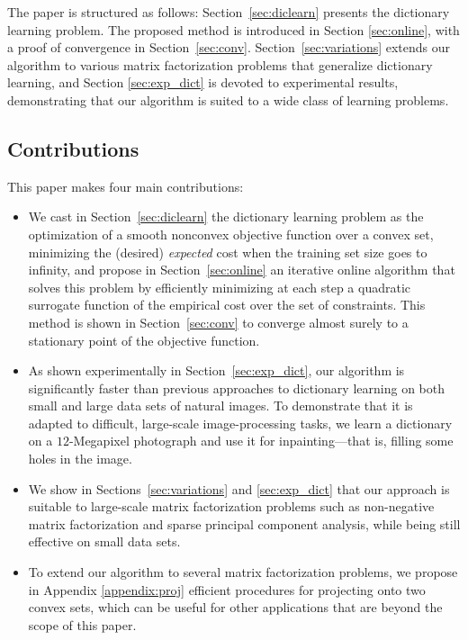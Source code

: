 \documentclass[twoside,11pt]{article}
\begin{document}
The paper is structured as follows: Section~\ref{sec:diclearn} presents
the dictionary learning problem.  The proposed method is introduced in Section
\ref{sec:online}, with a proof of convergence in Section~\ref{sec:conv}.
Section~\ref{sec:variations} extends our algorithm to various matrix factorization
problems that generalize dictionary learning, and Section
\ref{sec:exp_dict} is devoted to experimental results, demonstrating
that our algorithm is suited to a wide class of learning problems.
\subsection{Contributions}
This paper makes four main contributions: 
\begin{itemize}
   \item We cast in Section~\ref{sec:diclearn} the dictionary learning
      problem as the optimization of  a smooth nonconvex objective function
      over a convex set,  minimizing the (desired) {\em expected} cost
      when the training set size goes
      to infinity, and propose in Section~\ref{sec:online} an iterative online algorithm
      that solves this problem by efficiently minimizing at each step a
      quadratic surrogate function of the empirical cost over the set of
      constraints.  This method is shown in Section~\ref{sec:conv} to
      converge almost surely to a stationary point of the objective
      function. 
   \item As shown experimentally in Section~\ref{sec:exp_dict}, our algorithm
      is significantly faster than previous approaches to dictionary learning
      on both small and large data sets of natural images. To demonstrate that
      it is adapted to difficult, large-scale image-processing tasks, we
      learn a dictionary on a $12$-Megapixel photograph and use it for
      inpainting---that is, filling some holes in the image.
   \item We show in Sections~\ref{sec:variations} and \ref{sec:exp_dict} that our approach
      is suitable to large-scale matrix factorization problems such as
      non-negative matrix factorization and sparse principal component
      analysis, while being still effective on small data sets.
   \item To extend our algorithm to several matrix factorization problems, 
      we propose in Appendix \ref{appendix:proj} efficient procedures for
      projecting onto two convex sets, which can be useful for other
      applications that are beyond the scope of this paper.
\end{itemize}
\end{document}
